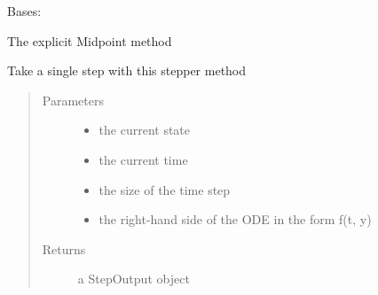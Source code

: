 \documentclass[letterpaper,10pt,english]{sphinxmanual}
\begin{document}
\begin{fulllineitems}
\label{\detokenize{spitfire.time.methods:spitfire.time.methods.ExplicitRungeKutta2Midpoint}}
Bases: {\hyperref[\detokenize{spitfire.time.methods:spitfire.time.methods.ExplicitRungeKutta}]{}}

The explicit Midpoint method

\begin{fulllineitems}
\label{\detokenize{spitfire.time.methods:spitfire.time.methods.ExplicitRungeKutta2Midpoint.single_step}}
Take a single step with this stepper method
\begin{quote}\begin{description}
\item[{Parameters}] \leavevmode\begin{itemize}
\item {} 
 \textendash{} the current state

\item {} 
 \textendash{} the current time

\item {} 
 \textendash{} the size of the time step

\item {} 
 \textendash{} the right-hand side of the ODE in the form f(t, y)

\end{itemize}

\item[{Returns}] \leavevmode
a StepOutput object

\end{description}\end{quote}

\end{fulllineitems}


\end{fulllineitems}
\end{document}
